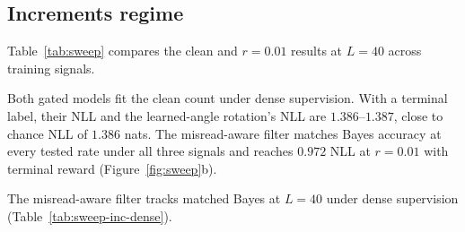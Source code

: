 \subsection{Increments regime}
Table~\ref{tab:sweep} compares the clean and $r=0.01$ results at $L=40$
across training signals.

Both gated models fit the clean count under dense supervision. With a
terminal label, their NLL and the learned-angle rotation's NLL are
$1.386$--$1.387$, close to chance NLL of $1.386$ nats. The misread-aware
filter matches Bayes accuracy
at every tested rate under all three signals and reaches $0.972$ NLL at
$r=0.01$ with terminal reward (Figure~\ref{fig:sweep}b).

The misread-aware filter tracks matched Bayes at $L=40$ under dense
supervision (Table~\ref{tab:sweep-inc-dense}).

